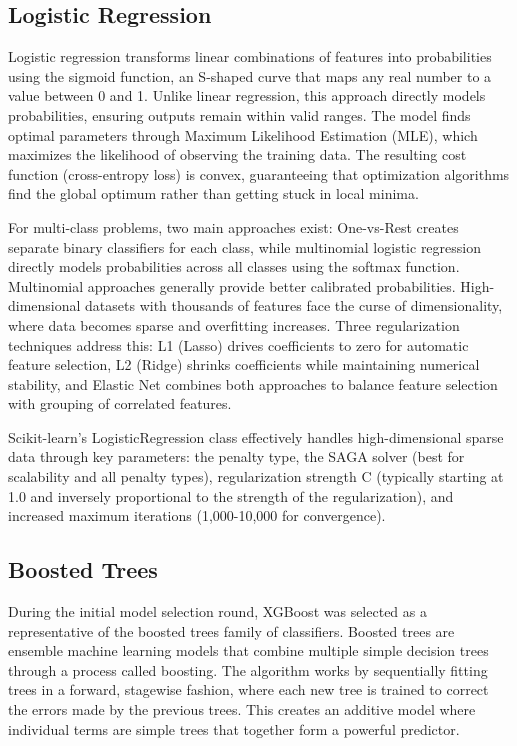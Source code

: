 \documentclass[
  titlepage]{article}
\begin{document}
\subsection{Logistic Regression}\label{logistic-regression}

Logistic regression transforms linear combinations of features into
probabilities using the sigmoid function, an S-shaped curve that maps
any real number to a value between 0 and 1. Unlike linear regression,
this approach directly models probabilities, ensuring outputs remain
within valid ranges. The model finds optimal parameters through Maximum
Likelihood Estimation (MLE), which maximizes the likelihood of observing
the training data. The resulting cost function (cross-entropy loss) is
convex, guaranteeing that optimization algorithms find the global
optimum rather than getting stuck in local minima.

For multi-class problems, two main approaches exist: One-vs-Rest creates
separate binary classifiers for each class, while multinomial logistic
regression directly models probabilities across all classes using the
softmax function. Multinomial approaches generally provide better
calibrated probabilities. High-dimensional datasets with thousands of
features face the curse of dimensionality, where data becomes sparse and
overfitting increases. Three regularization techniques address this: L1
(Lasso) drives coefficients to zero for automatic feature selection, L2
(Ridge) shrinks coefficients while maintaining numerical stability, and
Elastic Net combines both approaches to balance feature selection with
grouping of correlated features.

Scikit-learn's LogisticRegression class effectively handles
high-dimensional sparse data through key parameters: the penalty type,
the SAGA solver (best for scalability and all penalty types),
regularization strength C (typically starting at 1.0 and inversely
proportional to the strength of the regularization), and increased
maximum iterations (1,000-10,000 for convergence).

\subsection{Boosted Trees}\label{boosted-trees}

During the initial model selection round, XGBoost was selected as a
representative of the boosted trees family of classifiers. Boosted trees
are ensemble machine learning models that combine multiple simple
decision trees through a process called boosting. The algorithm works by
sequentially fitting trees in a forward, stagewise fashion, where each
new tree is trained to correct the errors made by the previous trees.
This creates an additive model where individual terms are simple trees
that together form a powerful predictor.
\end{document}
